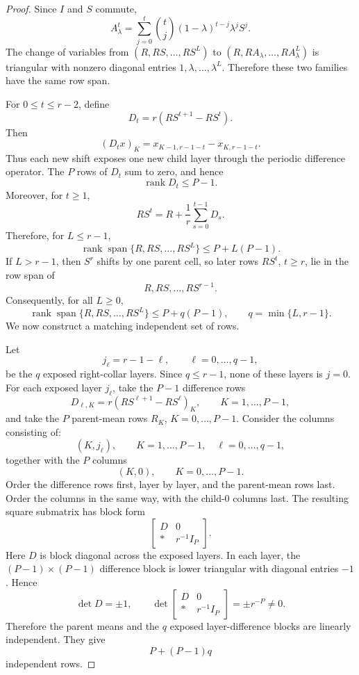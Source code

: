 \documentclass[pdflatex,sn-mathphys-num]{sn-jnl}%
\DeclareMathOperator{\rank}{rank}
\theoremstyle{thmstyleone}%
\theoremstyle{thmstyletwo}%
\theoremstyle{thmstylethree}%
\begin{document}
\begin{proof}
Since \(I\) and \(S\) commute,
\[
  A_\lambda^t
  =
  \sum_{j=0}^{t}
  \binom{t}{j}
  (1-\lambda)^{t-j}\lambda^j S^j .
\]
The change of variables from
\((R,RS,\ldots,RS^L)\) to
\((R,RA_\lambda,\ldots,RA_\lambda^L)\) is triangular with nonzero diagonal
entries \(1,\lambda,\ldots,\lambda^L\).  Therefore these two families have
the same row span.

For \(0\le t\le r-2\), define
\[
  D_t=r(RS^{t+1}-RS^t).
\]
Then
\[
  (D_t x)_K
  =
  x_{K-1,r-1-t}-x_{K,r-1-t}.
\]
Thus each new shift exposes one new child layer through the periodic
difference operator.  The \(P\) rows of \(D_t\) sum to zero, and hence
\[
  \rank D_t\le P-1.
\]
Moreover, for \(t\ge1\),
\[
  RS^t
  =
  R+\frac1r\sum_{s=0}^{t-1}D_s.
\]
Therefore, for \(L\le r-1\),
\[
  \rank\operatorname{span}\{R,RS,\ldots,RS^L\}
  \le
  P+L(P-1).
\]
If \(L>r-1\), then \(S^r\) shifts by one parent cell, so later rows
\(RS^t\), \(t\ge r\), lie in the row span of
\[
  R,RS,\ldots,RS^{r-1}.
\]
Consequently, for all \(L\ge0\),
\[
  \rank\operatorname{span}\{R,RS,\ldots,RS^L\}
  \le
  P+q(P-1),
  \qquad
  q=\min\{L,r-1\}.
\]
We now construct a matching independent set of rows.

Let
\[
  j_\ell=r-1-\ell,
  \qquad
  \ell=0,\ldots,q-1,
\]
be the \(q\) exposed right-collar layers.  Since \(q\le r-1\), none of these
layers is \(j=0\).  For each exposed layer \(j_\ell\), take the \(P-1\)
difference rows
\[
  D_{\ell,K}
  =
  r(RS^{\ell+1}-RS^\ell)_K,
  \qquad
  K=1,\ldots,P-1,
\]
and take the \(P\) parent-mean rows \(R_K\), \(K=0,\ldots,P-1\).  Consider
the columns consisting of:
\[
  (K,j_\ell),\qquad K=1,\ldots,P-1,\quad \ell=0,\ldots,q-1,
\]
together with the \(P\) columns
\[
  (K,0),\qquad K=0,\ldots,P-1.
\]
Order the difference rows first, layer by layer, and the parent-mean rows
last.  Order the columns in the same way, with the child-\(0\) columns last.
The resulting square submatrix has block form
\[
  \begin{bmatrix}
  D & 0\\
  * & r^{-1}I_P
  \end{bmatrix}.
\]
Here \(D\) is block diagonal across the exposed layers.  In each layer, the
\((P-1)\times(P-1)\) difference block is lower triangular with diagonal
entries \(-1\).  Hence
\[
  \det D=\pm1,
  \qquad
  \det
  \begin{bmatrix}
  D & 0\\
  * & r^{-1}I_P
  \end{bmatrix}
  =
  \pm r^{-P}\ne0.
\]
Therefore the parent means and the \(q\) exposed layer-difference blocks are
linearly independent.  They give
\[
  P+(P-1)q
\]
independent rows.


\end{proof}
\end{document}
